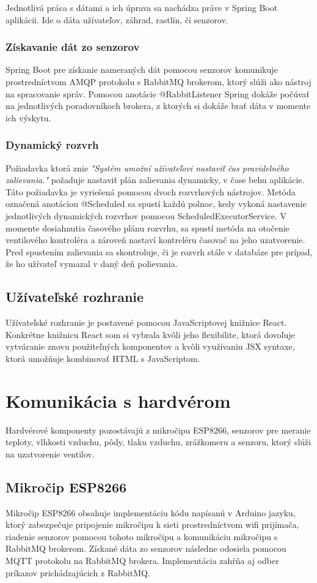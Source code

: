\documentclass[twoside]{ctuthesis}
\theoremstyle{plain}
\theoremstyle{definition}
\theoremstyle{note}
\begin{document}
Jednotlivá práca s dátami a ich úprava sa nachádza práve v Spring Boot aplikácii. Ide o dáta užívateľov, záhrad, rastlín, či senzorov. 

\subsubsection{Získavanie dát zo senzorov}
Spring Boot pre získanie nameraných dát pomocou senzorov komunikuje prostredníctvom AMQP protokolu s RabbitMQ brokerom, ktorý slúži ako nástroj na spracovanie správ. Pomocou anotácie  \textsf{@RabbitListener} Spring dokáže počúvať na jednotlivých poradovníkoch brokera, z ktorých si dokáže brať dáta v momente ich výskytu.

\subsubsection{Dynamický rozvrh}
Požiadavka ktorá znie \textit{"Systém umožní užívateľovi nastaviť čas pravidelného zalievania."} požaduje nastaviť plán zalievania dynamicky, v čase behu aplikácie. Táto požiadavka je vyriešená pomocou dvoch rozvrhových nástrojov. Metóda označená anotáciou \textsf{@Scheduled} sa spustí každú polnoc, kedy vykoná nastavenie jednotlivých dynamických rozvrhov pomocou \textsf{ScheduledExecutorService}. V momente dosiahnutia časového plánu rozvrhu, sa spustí metóda na otočenie ventilového kontroléra a zároveň nastaví kontreléru časovač na jeho uzatvorenie. Pred spustením zalievania sa skontroluje, či je rozvrh stále v databáze pre prípad, že ho užívateľ vymazal v daný deň polievania.

\subsection{Užívateľské rozhranie}
Užívateľské rozhranie je postavené pomocou JavaScriptovej knižnice React.  Konkrétne knižnicu React som si vybrala kvôli jeho flexibilite, ktorá dovoľuje vytváranie znovu použiteľných komponentov a kvôli využívaniu JSX syntaxe, ktorá umožňuje kombinovať HTML s JavaScriptom.


\section{Komunikácia s hardvérom}
Hardvérové komponenty pozostávajú z mikročipu ESP8266, senzorov pre meranie teploty, vlhkosti vzduchu, pôdy, tlaku vzduchu, zrážkomeru a senzoru, ktorý slúži na uzatvorenie ventilov.

\subsection{Mikročip ESP8266}
Mikročip ESP8266 obsahuje implementáciu kódu napísanú v Arduino jazyku, ktorý zabezpečuje pripojenie mikročipu k sieti prostredníctvom wifi prijímača, riadenie senzorov pomocou tohoto mikročipu a komunikáciu mikročipu s RabbitMQ brokerom. Získané dáta zo senzorov následne odosiela pomocou MQTT protokolu na RabbitMQ brokera. Implementácia zahŕňa aj odber príkazov prichádzajúcich z RabbitMQ.
\end{document}
